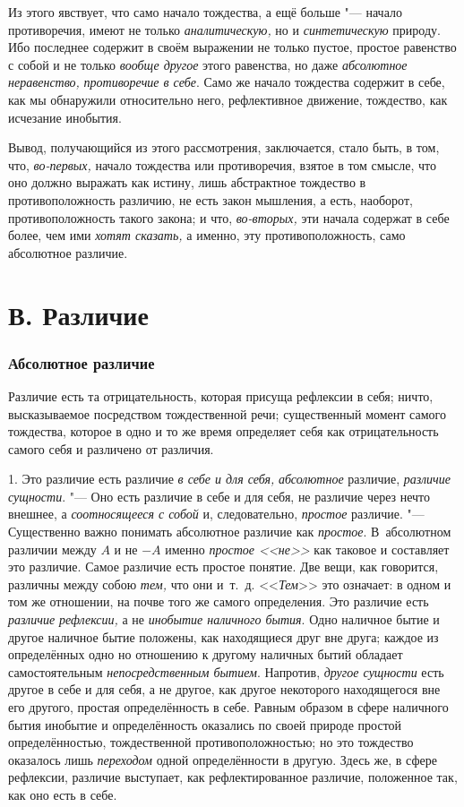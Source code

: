 Из этого явствует, что само начало тождества, а ещё больше "--- начало
противоречия, имеют не только {\em аналитическую,} но и
{\em синтетическую} природу. Ибо последнее содержит в
своём выражении не только пустое, простое равенство с собой и не только
{\em вообще другое} этого равенства, но даже
{\em абсолютное неравенство,}
{\em противоречие в себе}. Само же начало тождества
содержит в себе, как мы обнаружили относительно него, рефлективное
движение, тождество, как исчезание инобытия.

Вывод, получающийся из этого рассмотрения, заключается, стало быть, в том,
что, {\em во-первых,} начало тождества или
противоречия, взятое в том смысле, что оно должно выражать как истину, лишь
абстрактное тождество в противоположность различию, не есть закон мышления,
а есть, наоборот, противоположность такого закона; и что,
{\em во-вторых,} эти начала содержат в себе более, чем
ими {\em хотят сказать,} а именно, эту
противоположность, само абсолютное различие.

\section[В. Различие]{В. Различие}
\subsubsection{Абсолютное различие}
Различие есть та отрицательность, которая
присуща рефлексии в себя; ничто, высказываемое посредством тождественной
речи; существенный момент самого тождества, которое в одно и то же время
определяет себя как отрицательность самого себя и различено от различия.

1. Это различие есть различие {\em в себе и для себя,}
{\em абсолютное} различие,
{\em различие сущности}. "--- Оно есть различие в себе и
для себя, не различие через нечто внешнее, а
{\em соотносящееся с собой} и, следовательно,
{\em простое} различие. "--- Существенно важно понимать
абсолютное различие как {\em простое}. В~абсолютном
различии между $A$ и не $-A$ именно
{\em простое <<не>>} как таковое и составляет это
различие. Самое различие есть простое понятие. Две вещи, как говорится,
различны между собою {\em тем,} что они и~т.~д.
<<{\em Тем}>> это означает: в одном и том же отношении,
на почве того же самого определения. Это различие есть
{\em различие рефлексии,} а не
{\em инобытие наличного бытия}. Одно наличное бытие и
другое наличное бытие положены, как находящиеся друг вне друга; каждое из
определённых одно но отношению к другому наличных бытий обладает
самостоятельным {\em непосредственным бытием}.
Напротив, {\em другое сущности} есть другое в себе и
для себя, а не другое, как другое некоторого находящегося вне его другого,
простая определённость в себе. Равным образом в сфере наличного бытия
инобытие и определённость оказались по своей природе простой
определённостью, тождественной противоположностью; но это тождество
оказалось лишь {\em переходом} одной определённости в
другую. Здесь же, в сфере рефлексии, различие выступает, как
рефлектированное различие, положенное так, как оно есть в себе.


